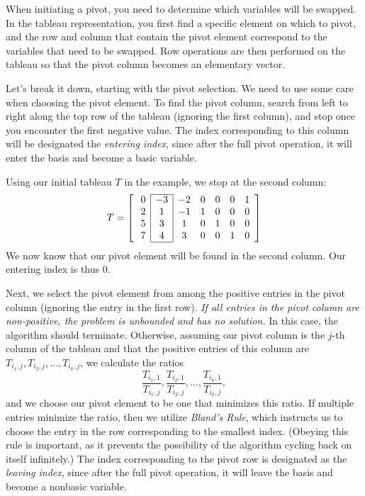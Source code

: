When initiating a pivot, you need to determine which variables will be swapped.
In the tableau representation, you first find a specific element on which to pivot, and the row and column that contain the pivot
element correspond to the variables that need to be swapped.
Row operations are then performed on the tableau so that the pivot column becomes an elementary vector.

Let's break it down, starting with the pivot selection. We need to use some care when choosing the pivot element.
To find the pivot column, search from left to right along the top row of the tableau
(ignoring the first column), and stop once you encounter the first negative value. The index corresponding
to this column will be designated the \emph{entering index}, since after the full pivot operation, it will enter
the basis and become a basic variable.

Using our initial tableau $T$ in the example, we stop at the second column:
\[ T = \left[ \:
\begin{array}{*{7}{c}}
\cline{2-2}
0 & \multicolumn{1}{|c}{-3} & \multicolumn{1}{|c}{-2} & 0 & 0 & 0 & 1\\
2 & \multicolumn{1}{|c}{1} & \multicolumn{1}{|c}{-1} & 1 & 0 & 0 & 0\\
5 & \multicolumn{1}{|c}{3} & \multicolumn{1}{|c}{1} & 0 & 1 & 0 & 0\\
7 & \multicolumn{1}{|c}{4} & \multicolumn{1}{|c}{3} & 0 & 0 & 1 & 0\\
\cline{2-2}
\end{array}
\right] \]
We now know that our pivot element will be found in the second column. Our entering index is thus $0$.

Next, we select the pivot element from among the positive entries in the pivot column (ignoring the entry in the first row).
\emph{If all entries in the pivot column are non-positive, the problem is unbounded and has no solution.} In this case, the algorithm
should terminate.
Otherwise, assuming our pivot column is the $j$-th column of the tableau and that the positive entries of this column are
$T_{i_1, j}, T_{i_2, j}, \ldots, T_{i_k, j}$, we calculate the ratios
\[
\frac{T_{i_1,1}}{T_{i_1,j}}, \frac{T_{i_2,1}}{T_{i_2,j}}, \ldots, \frac{T_{i_k,1}}{T_{i_k,j}},
\]
and we choose our pivot element to be one that minimizes this ratio. If multiple entries minimize the ratio, then we utilize
\emph{Bland's Rule}, which instructs us to choose the entry in the row corresponding to the smallest index.
(Obeying this rule is important, as it prevents the possibility of the algorithm cycling back on itself infinitely.)
The index corresponding to the pivot row is designated as the \emph{leaving index}, since after the full pivot operation,
it will leave the basis and become a nonbasic variable.

